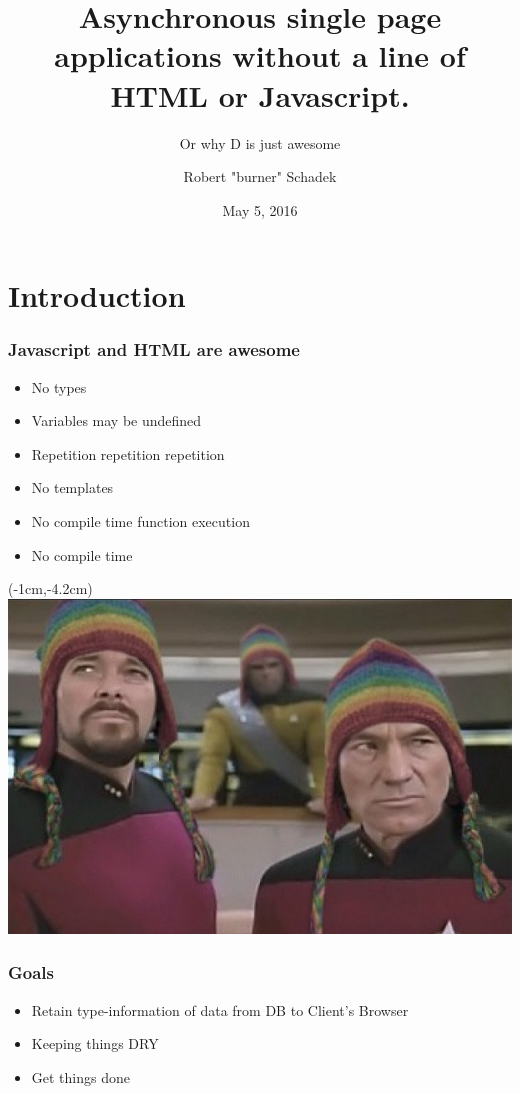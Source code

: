 \documentclass[notes,xelatex,13pt]{beamer}
\title{Asynchronous single page applications without a line of HTML or
Javascript.}
\subtitle{Or why D is just awesome}
\author{Robert "burner" Schadek}
\date{May 5, 2016}
\institute{DConf}
\begin{document}
\section{Introduction}
\maketitle

\begin{frame}
	\frametitle{Javascript and HTML are \textbf{awesome}}
	\begin{itemize}
		\item No types
		\item Variables may be undefined
		\item Repetition repetition repetition
		\item No templates
		\item No compile time function execution
			\pause
		\item No compile time
	\end{itemize}
\end{frame}


\begin{frame}[plain]
\begin{textblock*}{0cm}(-1cm,-4.2cm)
	\includegraphics[width=1.0\paperwidth]{picardriker.jpg}
\end{textblock*}
\end{frame}

\begin{frame}
	\frametitle{Goals}	
	\begin{itemize}
		\item Retain type-information of data from DB to Client's Browser
			\pause
		\item Keeping things DRY	
			\pause
		\item Get things done
			\pause
	\end{itemize}
\end{frame}
\end{document}
